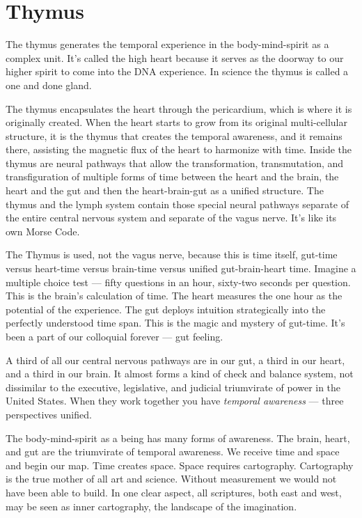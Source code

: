 \documentclass[letterpaper,9pt,twoside,titlepage,onecolumn,openany]{book}
\begin{document}
\section*{Thymus}\label{thymus}

The thymus generates the temporal experience in the body-mind-spirit as
a complex unit. It's called the high heart because it serves as the
doorway to our higher spirit to come into the DNA experience. In science
the thymus is called a one and done gland.

The thymus encapsulates the heart through the pericardium, which is
where it is originally created. When the heart starts to grow from its
original multi-cellular structure, it is the thymus that creates the
temporal awareness, and it remains there, assisting the magnetic flux of
the heart to harmonize with time. Inside the thymus are neural pathways
that allow the transformation, transmutation, and transfiguration of
multiple forms of time between the heart and the brain, the heart and
the gut and then the heart-brain-gut as a unified structure. The thymus
and the lymph system contain those special neural pathways separate of
the entire central nervous system and separate of the vagus nerve. It's
like its own Morse Code.

The Thymus is used, not the vagus nerve, because this is time itself,
gut-time versus heart-time versus brain-time versus unified
gut-brain-heart time. Imagine a multiple choice test --- fifty questions
in an hour, sixty-two seconds per question. This is the brain's
calculation of time. The heart measures the one hour as the potential of
the experience. The gut deploys intuition strategically into the
perfectly understood time span. This is the magic and mystery of
gut-time. It's been a part of our colloquial forever --- gut feeling.

A third of all our central nervous pathways are in our gut, a third in
our heart, and a third in our brain. It almost forms a kind of check and
balance system, not dissimilar to the executive, legislative, and
judicial triumvirate of power in the United States. When they work
together you have \emph{temporal awareness} --- three perspectives
unified.

The body-mind-spirit as a being has many forms of awareness. The brain,
heart, and gut are the triumvirate of temporal awareness. We receive
time and space and begin our map. Time creates space. Space requires
cartography. Cartography is the true mother of all art and science.
Without measurement we would not have been able to build. In one clear
aspect, all scriptures, both east and west, may be seen as inner
cartography, the landscape of the imagination.
\end{document}
